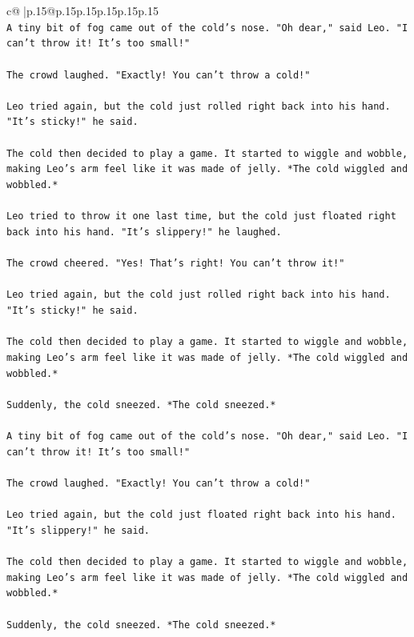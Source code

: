 \documentclass{article}
\begin{document}
{\begin{supertabular}{c@{$\;$}|p{.15\linewidth}@{}p{.15\linewidth}p{.15\linewidth}p{.15\linewidth}p{.15\linewidth}p{.15\linewidth}}
{{{\\ 
\texttt{A tiny bit of fog came out of the cold's nose. "Oh dear," said Leo. "I can't throw it! It's too small!"} \\
\\ 
\texttt{The crowd laughed. "Exactly! You can't throw a cold!"} \\
\\ 
\texttt{Leo tried again, but the cold just rolled right back into his hand. "It's sticky!" he said.} \\
\\ 
\texttt{The cold then decided to play a game. It started to wiggle and wobble, making Leo's arm feel like it was made of jelly. *The cold wiggled and wobbled.*} \\
\\ 
\texttt{Leo tried to throw it one last time, but the cold just floated right back into his hand. "It's slippery!" he laughed.} \\
\\ 
\texttt{The crowd cheered. "Yes! That's right! You can't throw it!"} \\
\\ 
\texttt{Leo tried again, but the cold just rolled right back into his hand. "It's sticky!" he said.} \\
\\ 
\texttt{The cold then decided to play a game. It started to wiggle and wobble, making Leo's arm feel like it was made of jelly. *The cold wiggled and wobbled.*} \\
\\ 
\texttt{Suddenly, the cold sneezed. *The cold sneezed.*} \\
\\ 
\texttt{A tiny bit of fog came out of the cold's nose. "Oh dear," said Leo. "I can't throw it! It's too small!"} \\
\\ 
\texttt{The crowd laughed. "Exactly! You can't throw a cold!"} \\
\\ 
\texttt{Leo tried again, but the cold just floated right back into his hand. "It's slippery!" he said.} \\
\\ 
\texttt{The cold then decided to play a game. It started to wiggle and wobble, making Leo's arm feel like it was made of jelly. *The cold wiggled and wobbled.*} \\
\\ 
\texttt{Suddenly, the cold sneezed. *The cold sneezed.*} \\
}}}
\end{supertabular}}
\end{document}

